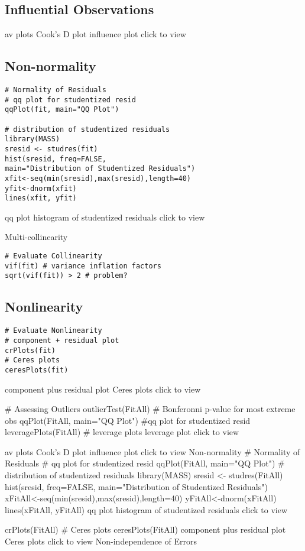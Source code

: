 \subsection{Influential Observations}


av plots Cook's D plot influence plot click to view
\subsection{Non-normality}
\begin{framed}
\begin{verbatim}
# Normality of Residuals
# qq plot for studentized resid
qqPlot(fit, main="QQ Plot")

# distribution of studentized residuals
library(MASS)
sresid <- studres(fit) 
hist(sresid, freq=FALSE, 
main="Distribution of Studentized Residuals")
xfit<-seq(min(sresid),max(sresid),length=40) 
yfit<-dnorm(xfit) 
lines(xfit, yfit)
\end{verbatim}
\end{framed}
qq plot histogram of studentized residuals click to view

Multi-collinearity
\begin{framed}
\begin{verbatim}
# Evaluate Collinearity
vif(fit) # variance inflation factors 
sqrt(vif(fit)) > 2 # problem?
\end{verbatim}
\end{framed}
\subsection{Nonlinearity}
\begin{framed}
	\begin{verbatim}
# Evaluate Nonlinearity
# component + residual plot 
crPlots(fit)
# Ceres plots 
ceresPlots(fit)
\end{verbatim}
\end{framed}
component plus residual plot Ceres plots click to view


# Assessing Outliers
outlierTest(FitAll) # Bonferonni p-value for most extreme obs
qqPlot(FitAll, main="QQ Plot") #qq plot for studentized resid 
leveragePlots(FitAll) # leverage plots
leverage plot click to view



av plots Cook's D plot influence plot click to view
Non-normality
# Normality of Residuals
# qq plot for studentized resid
qqPlot(FitAll, main="QQ Plot")
# distribution of studentized residuals
library(MASS)
sresid <- studres(FitAll) 
hist(sresid, freq=FALSE, 
main="Distribution of Studentized Residuals")
xFitAll<-seq(min(sresid),max(sresid),length=40) 
yFitAll<-dnorm(xFitAll) 
lines(xFitAll, yFitAll)
qq plot histogram of studentized residuals click to view



crPlots(FitAll)
# Ceres plots 
ceresPlots(FitAll)
component plus residual plot Ceres plots click to view
Non-independence of Errors
